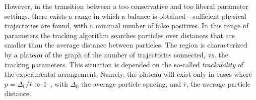 However, in the transition between a too conservative and too liberal parameter settings, there exists a range in which a balance is obtained - sufficient physical trajectories are found, with a minimal number of false positives. In this range of parameters the tracking algorithm searches particles over distances that are smaller than the average distance between particles. The region is characterized by a plateau of the graph of the number of trajectories connected, vs. the tracking parameters. This situation is depended on the so-called \emph{trackability} of the experimental arrangement. Namely, the plateau will exist only in cases where $p=\Delta_0 / \overline{r} \gg 1$~\citep{Dracos1996}, with $\Delta_0$ the average particle spacing, and $\overline{r}$, the average particle distance.  


